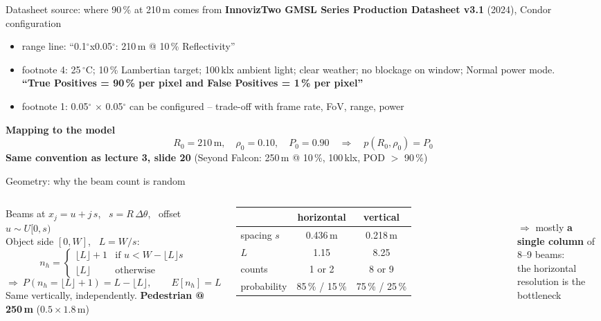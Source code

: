 \documentclass[aspectratio=169,11pt]{beamer}
\begin{document}
\begin{frame}{Datasheet source: where 90\,\% at 210\,m comes from}
  \small
  \textbf{InnovizTwo GMSL Series Production Datasheet v3.1} (2024), Condor configuration
  \begin{itemize}
    \item range line: ``0.1$^\circ$x0.05$^\circ$: 210\,m @ 10\,\% Reflectivity''
    \item footnote 4: 25\,$^\circ$C; 10\,\% Lambertian target; 100\,klx ambient light; clear weather;
      no blockage on window; Normal power mode.\\
      \textbf{``True Positives = 90\,\% per pixel and False Positives = 1\,\% per pixel''}
    \item footnote 1: 0.05$^\circ$ $\times$ 0.05$^\circ$ can be configured -- trade-off with
      frame rate, FoV, range, power
  \end{itemize}
  \vspace{0.5em}
  \textbf{Mapping to the model}
  \[
    R_0 = 210\,\text{m}, \quad \rho_0 = 0.10, \quad P_0 = 0.90
    \quad\Rightarrow\quad p(R_0, \rho_0) = P_0
  \]
  \textbf{Same convention as lecture 3, slide 20} (Seyond Falcon: 250\,m @ 10\,\%, 100\,klx, POD $>$ 90\,\%)
\end{frame}

\begin{frame}{Geometry: why the beam count is random}
  \begin{columns}[c]
    \small
    Beams at $x_j = u + j\,s$, \ $s = R\,\Delta\theta$, \ offset $u \sim U[0,s)$\\[0.5em]
    Object side $[0, W]$, \ $L = W/s$:
    \[
      n_h = \begin{cases}
        \lfloor L\rfloor + 1 & \text{if } u < W - \lfloor L\rfloor s \\
        \lfloor L\rfloor & \text{otherwise}
      \end{cases}
    \]
    \[
      \Rightarrow\ P(n_h = \lfloor L\rfloor + 1) = L - \lfloor L\rfloor,
      \qquad E[n_h] = L
    \]
    Same vertically, independently.
    \small
    \textbf{Pedestrian @ 250\,m} ($0.5 \times 1.8$\,m)\\[0.3em]
    \begin{tabular}{lcc}
      \toprule
      & horizontal & vertical \\
      \midrule
      spacing $s$ & 0.436\,m & 0.218\,m \\
      $L$ & 1.15 & 8.25 \\
      counts & 1 or 2 & 8 or 9 \\
      probability & 85\,\% / 15\,\% & 75\,\% / 25\,\% \\
      \bottomrule
    \end{tabular}\\[0.8em]
    $\Rightarrow$ mostly \textbf{a single column} of 8--9 beams:\\
    the horizontal resolution is the bottleneck
  \end{columns}
\end{frame}
\end{document}
